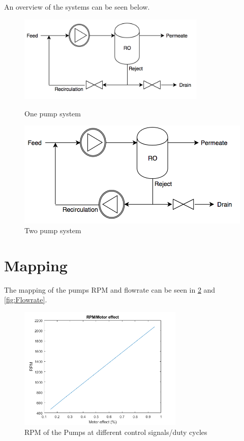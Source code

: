 An overview of the systems can be seen below.\\
\begin{figure}[h]
\centering
\begin{minipage}{.5\textwidth}
    \centering
    \includegraphics[width=0.8\textwidth]{Sys1}
    \caption{One pump system}
    \label{fig:System1}
\end{minipage}%
\begin{minipage}{.5\textwidth}
  \centering
  \includegraphics[width=.8\linewidth]{Sys2}
  \caption{Two pump system}
  \label{fig:System2}
\end{minipage}
\end{figure}

\newpage

\section{Mapping}
The mapping of the pumps RPM and flowrate can be seen in \ref{fig:RPM} and \ref{fig:Flowrate}.
\begin{figure}[h]
    \centering
    \includegraphics[width=0.7\textwidth]{RPM.png}
    \caption{RPM of the Pumps at different control signals/duty cycles}
    \label{fig:RPM}
\end{figure}


